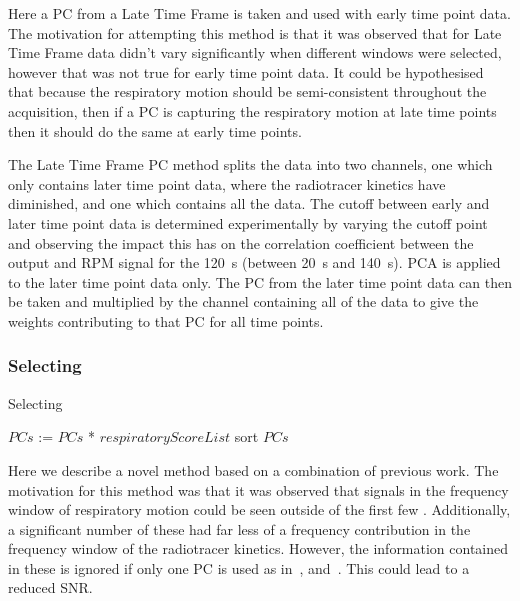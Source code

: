             Here a \gls{PC} from a Late Time Frame is taken and used with early time point data. The motivation for attempting this method is that it was observed that  for Late Time Frame data didn't vary significantly when different windows were selected, however that was not true for early time point data. It could be hypothesised that because the respiratory motion should be semi-consistent throughout the acquisition, then if a \gls{PC} is capturing the respiratory motion at late time points then it should do the same at early time points.
            
            The Late Time Frame \gls{PC} method splits the data into two channels, one which only contains later time point data, where the radiotracer kinetics have diminished, and one which contains all the data. The cutoff between early and later time point data is determined experimentally by varying the cutoff point and observing the impact this has on the correlation coefficient between the output and \gls{RPM} signal for the \SI{120}{\second} (between \SI{20}{\second} and \SI{140}{\second}). \gls{PCA} is applied to the later time point data only. The \gls{PC} from the later time point data can then be taken and multiplied by the channel containing all of the data to give the weights contributing to that \gls{PC} for all time points.
        
            
        \subsubsection{Selecting } \label{sec:selecting_pcs}
            \begin{algorithm}
                \caption{Selecting }
                \;
                \;
                $PCs$ := $PCs$ * $respiratoryScoreList$\;
                sort $PCs$\;
            \end{algorithm} \label{eq:selecting_pcs_pseudo_code}
            
            Here we describe a novel method based on a combination of previous work. The motivation for this method was that it was observed that signals in the frequency window of respiratory motion could be seen outside of the first few . Additionally, a significant number of these had far less of a frequency contribution in the frequency window of the radiotracer kinetics. However, the information contained in these  is ignored if only one \gls{PC} is used as in~\cite{Thielemans2011}, and~\cite{Bertolli2018Data-DrivenTomography}. This could lead to a reduced \gls{SNR}.
            
